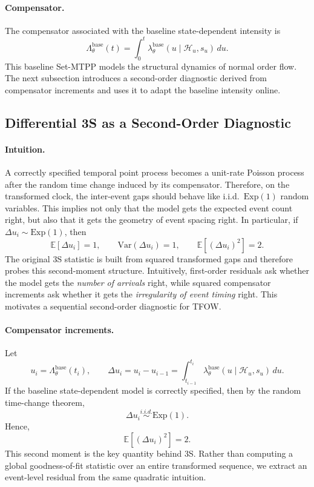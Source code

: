 \paragraph{Compensator.}
The compensator associated with the baseline state-dependent intensity is
\[
\Lambda_{\theta}^{\mathrm{base}}(t)
=
\int_0^t \lambda_{\theta}^{\mathrm{base}}(u\mid \mathcal H_u,s_u)\,du.
\]
This baseline Set-MTPP models the structural dynamics of normal order flow. The next subsection introduces a second-order diagnostic derived from compensator increments and uses it to adapt the baseline intensity online.


\subsection{Differential 3S as a Second-Order Diagnostic}

\paragraph{Intuition.}
A correctly specified temporal point process becomes a unit-rate Poisson process after the random time change induced by its compensator. Therefore, on the transformed clock, the inter-event gaps should behave like i.i.d.\ \(\mathrm{Exp}(1)\) random variables. This implies not only that the model gets the expected event count right, but also that it gets the geometry of event spacing right. In particular, if \(\Delta u_i \sim \mathrm{Exp}(1)\), then
\[
\mathbb E[\Delta u_i]=1,
\qquad
\mathrm{Var}(\Delta u_i)=1,
\qquad
\mathbb E[(\Delta u_i)^2]=2.
\]
The original 3S statistic is built from squared transformed gaps and therefore probes this second-moment structure. Intuitively, first-order residuals ask whether the model gets the \emph{number of arrivals} right, while squared compensator increments ask whether it gets the \emph{irregularity of event timing} right. This motivates a sequential second-order diagnostic for TFOW.

\paragraph{Compensator increments.}
Let
\[
u_i=\Lambda_{\theta}^{\mathrm{base}}(t_i),
\qquad
\Delta u_i=u_i-u_{i-1}
=
\int_{t_{i-1}}^{t_i}\lambda_{\theta}^{\mathrm{base}}(u\mid \mathcal H_u,s_u)\,du.
\]
If the baseline state-dependent model is correctly specified, then by the random time-change theorem,
\[
\Delta u_i \overset{i.i.d.}{\sim} \mathrm{Exp}(1).
\]
Hence,
\[
\mathbb E[(\Delta u_i)^2]=2.
\]
This second moment is the key quantity behind 3S. Rather than computing a global goodness-of-fit statistic over an entire transformed sequence, we extract an event-level residual from the same quadratic intuition.

